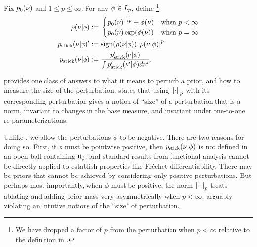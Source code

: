 \begin{defn}
%
Fix $p_{0}(\nu)$ and $1 \le p \le \infty$.  For any $\phi \in {L_{p}}$, define
\footnote{We have dropped a factor of $p$ from the perturbation when $p <
\infty$ relative to the definition in \citep{gustafson:1996:local}.}
%
\begin{align*}
%
\rho(\nu \vert \phi) :={}& \begin{cases}
%
\pbase(\nu)^{1/p} + \phi(\nu)
    & \textrm{when }p < \infty \\
\pbase(\nu)\exp(\phi(\nu))
    & \textrm{when }p = \infty
%
\end{cases}\\
%
\pstick(\nu \vert \phi)' :={}&
    \mathrm{sign}(\rho(\nu \vert \phi)) \abs{\rho(\nu \vert \phi)}^p\\
\pstick(\nu \vert \phi) :={}&
    \frac{\pstick'(\nu \vert \phi)}{\int \pstick'(\nu' \vert \phi) d\nu'}.
%
\end{align*}
%
\end{defn}
%

 provides one class of answers to what it means to perturb
a prior, and how to measure the size of the perturbation.  \citep[Result
2]{gustafson:1996:local} states that using $\left\Vert\cdot\right\Vert_p$ with its
corresponding perturbation gives a notion of ``size'' of a perturbation that is
a norm, invariant to changes in the base measure, and invariant under one-to-one
re-parameterizations.

Unlike \citep{gustafson:1996:local}, we allow the perturbations $\phi$ to be
negative.  There are two reasons for doing so.  First, if $\phi$ must be
pointwise positive, then $p_{\mathrm{stick}}(\nu \vert \phi)$ is not defined in an open
ball containing $0_\phi$, and standard results from functional analysis cannot be
directly applied to establish properties like Fr{\'e}chet differentiability.
There may be priors that cannot be achieved by considering only positive
perturbations.  But perhaps most importantly, when $\phi$ must be positive, the
norm $\left\Vert\cdot\right\Vert_p$ treats ablating and adding prior mass very asymmetrically
when $p < \infty$, arguably violating an intutive notions of the ``size''
of perturbation.

